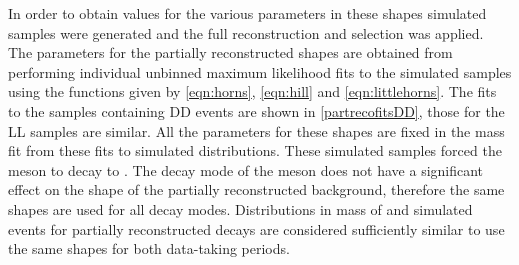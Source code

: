 \begin{table}[h]
\centering
{}
\caption{Different partially reconstructed shapes and \Dstar helicity states and how this relates to the dependence on the helicity angle and the \B mass parameterisation. The kinematic endpoints $a_i$ and $b_i$ are allowed to be different for each of the partially reconstructed shapes.}
\label{helicityamplitudes}
\end{table}

In order to obtain values for the various parameters in these shapes simulated samples were generated and the full reconstruction and selection was applied. The parameters for the partially reconstructed shapes are obtained from performing individual unbinned maximum likelihood fits to the simulated samples using the functions given by \eqns\ref{eqn:horns}, \ref{eqn:hill} and \ref{eqn:littlehorns}. The fits to the samples containing DD events are shown in \fig\ref{partrecofitsDD}, those for the LL samples are similar. All the parameters for these shapes are fixed in the mass fit from these fits to simulated distributions. These simulated samples forced the \Dz meson to decay to \Km\pip. The decay mode of the \Dz meson does not have a significant effect on the shape of the partially reconstructed background, therefore the same shapes are used for all \Dz decay modes. Distributions in \Bm mass of \runone and \runtwo simulated events for partially reconstructed decays are considered sufficiently similar to use the same shapes for both data-taking periods.

